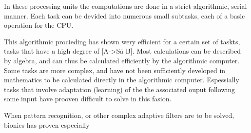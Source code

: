 In these processing units the computations are done in a strict algorithmic, serial manner.
Each task can be devided into numerous small subtasks, each of a basic operation for the CPU.

This algorithmic procieding has shown wery efficient for a certain set of taskts, tasks that have a high degree of [A->Så B]. 
Most calculations can be described by algebra, and can thus be calculated efficiently by the algorithmic computer.
Some tasks are more complex, and have not been sufficiently developed in mathematics to be calculated directly in the algorithmic computer.
Espessially tasks that involve adaptation (learning) of the the associated ouput following some input have prooven difficult to solve in this fasion.

When pattern recognition, or other complex adaptive filters are to be solved, bionics has proven especially 














